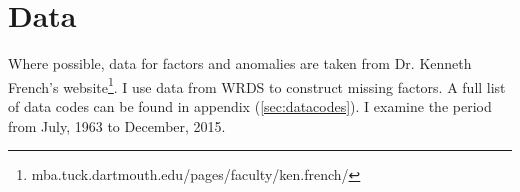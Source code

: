 
\section{Data}

Where possible, data for factors and anomalies are taken from Dr. Kenneth French's 
website\footnote{mba.tuck.dartmouth.edu/pages/faculty/ken.french/}.
I use data from WRDS to construct missing factors.
A full list of data codes can be found in appendix (\ref{sec:datacodes}).
I examine the period from July, 1963 to December, 2015.
